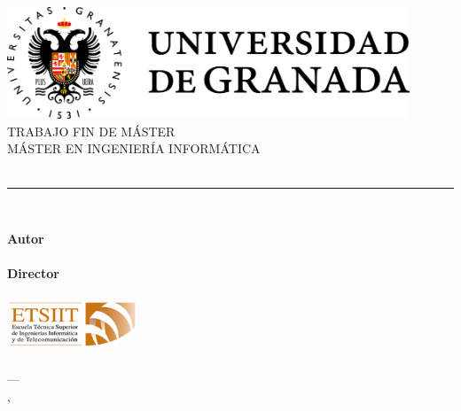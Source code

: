 \begin{titlepage}
 
\newlength{\centeroffset}
\setlength{\centeroffset}{-0.5\oddsidemargin}
\addtolength{\centeroffset}{0.5\evensidemargin}
\thispagestyle{empty}

\noindent\hspace*{\centeroffset}
\begin{minipage}{\textwidth}
\centering
\includegraphics[width=0.9\textwidth]{imagenes/ugr}\\[1.4cm]
\textsc{ \Large TRABAJO FIN DE MÁSTER\\[0.2cm]}
\textsc{ MÁSTER EN INGENIERÍA INFORMÁTICA}\\[1cm]
{\Huge\bfseries \myTitle \\}
\noindent\rule[-1ex]{\textwidth}{3pt}\\[3.5ex]
{\large\bfseries \mySubtitle}
\end{minipage}

\vspace{2.5cm}

\noindent\hspace*{\centeroffset}
\begin{minipage}{\textwidth}
\centering
\textbf{Autor}\\ {\myName}\\[2.5ex]
\textbf{Director}\\ {\myProf}\\[2cm]
\includegraphics[width=0.3\textwidth]{imagenes/etsiit}\\[0.1cm]
\textsc{\myFaculty}\\
\textsc{---}\\
\myLocation, \myTime
\end{minipage}

\end{titlepage}


